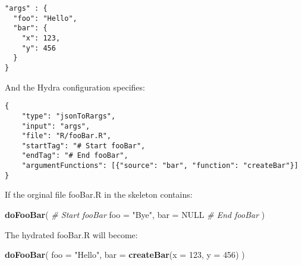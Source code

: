 \documentclass[]{article}
\newenvironment{Shaded}{\begin{snugshade}}{\end{snugshade}}
\newcommand{\CommentTok}[1]{\textcolor[rgb]{0.56,0.35,0.01}{\textit{#1}}}
\newcommand{\DataTypeTok}[1]{\textcolor[rgb]{0.13,0.29,0.53}{#1}}
\newcommand{\DecValTok}[1]{\textcolor[rgb]{0.00,0.00,0.81}{#1}}
\newcommand{\KeywordTok}[1]{\textcolor[rgb]{0.13,0.29,0.53}{\textbf{#1}}}
\newcommand{\NormalTok}[1]{#1}
\newcommand{\OtherTok}[1]{\textcolor[rgb]{0.56,0.35,0.01}{#1}}
\newcommand{\StringTok}[1]{\textcolor[rgb]{0.31,0.60,0.02}{#1}}
\begin{document}
\begin{verbatim}
"args" : {
  "foo": "Hello",
  "bar": {
    "x": 123,
    "y": 456
  }
}
\end{verbatim}

And the Hydra configuration specifies:

\begin{verbatim}
{
    "type": "jsonToRargs",
    "input": "args",
    "file": "R/fooBar.R",
    "startTag": "# Start fooBar",
    "endTag": "# End fooBar",
    "argumentFunctions": [{"source": "bar", "function": "createBar"}]
}
\end{verbatim}

If the orginal file fooBar.R in the skeleton contains:

\begin{Shaded}
\begin{Highlighting}[]
\KeywordTok{doFooBar}\NormalTok{(}
  \CommentTok{# Start fooBar}
  \DataTypeTok{foo =} \StringTok{"Bye"}\NormalTok{,}
  \DataTypeTok{bar =} \OtherTok{NULL}
  \CommentTok{# End fooBar}
\NormalTok{)}
\end{Highlighting}
\end{Shaded}

The hydrated fooBar.R will become:

\begin{Shaded}
\begin{Highlighting}[]
\KeywordTok{doFooBar}\NormalTok{(}
  \DataTypeTok{foo =} \StringTok{"Hello"}\NormalTok{,}
  \DataTypeTok{bar =} \KeywordTok{createBar}\NormalTok{(}\DataTypeTok{x =} \DecValTok{123}\NormalTok{,}
                  \DataTypeTok{y =} \DecValTok{456}\NormalTok{)}
\NormalTok{)}
\end{Highlighting}
\end{Shaded}
\end{document}
